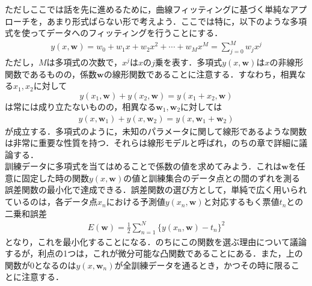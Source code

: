 \documentclass{jsarticle}
\theoremstyle{definition}
\begin{document}
ただしここでは話を先に進めるために，曲線フィッティングに基づく単純なアプローチを，あまり形式ばらない形で考えよう．ここでは特に，以下のような多項式を使ってデータへのフィッティングを行うことにする．
\begin{equation}
\begin{split}
y(x,{\bm w}) = w_0 + w_1x + w_2x^2 + \cdots + w_Mx^M = \sum_{j=0}^M w_j x^j
\end{split}
\end{equation}
ただし，$M$は多項式の次数で，$x^j$は$x$の$j$乗を表す．多項式$y(x,{\bm w})$は$x$の非線形関数であるものの，係数${\bm w}$の線形関数であることに注意する．すなわち，相異なる$x_1,x_2$に対して
$$y(x_1,{\bm w}) + y(x_2,{\bm w}) = y(x_1+x_2,{\bm w})$$
は常には成り立たないものの，相異なる${\bm w}_1,{\bm w}_2$に対しては
\begin{align}
  y(x,{\bm w}_1) + y(x,{\bm w}_2) = y(x,{\bm w}_1 + {\bm w}_2)
\end{align}
が成立する．多項式のように，未知のパラメータに関して線形であるような関数は非常に重要な性質を持つ．それらは線形モデルと呼ばれ，のちの章で詳細に議論する．\\
訓練データに多項式を当てはめることで係数の値を求めてみよう．これは${\bm w}$を任意に固定した時の関数$y(x,{\bm w})$の値と訓練集合のデータ点との間のずれを測る誤差関数の最小化で達成できる．誤差関数の選び方として，単純で広く用いられているのは，各データ点$x_n$における予測値$y(x_n,{\bm w})$と対応するもく票値$t_n$との二乗和誤差
\begin{align*}
E({\bm w}) = \frac{1}{2}\sum_{n=1}^N\{y(x_n,{\bm w}) - t_n\}^2
\end{align*}
となり，これを最小化することになる．のちにこの関数を選ぶ理由について議論するが，利点の1つは，これが微分可能な凸関数であることにある．また，上の関数が$0$となるのは$y(x,{\bm w}_n)$が全訓練データを通るとき，かつその時に限ることに注意する．\\
\end{document}
